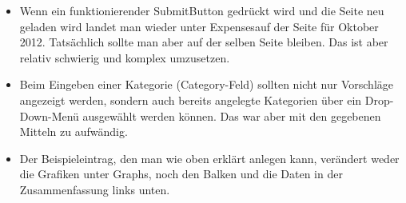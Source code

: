\documentclass[a4paper,10pt]{article}
\begin{document}
\begin{itemize}
    \item Wenn ein funktionierender \glqq Submit\grqq\space Button gedr\"uckt wird
            und die Seite neu geladen wird landet man wieder unter \glqq
            Expenses\grqq\space auf der Seite f\"ur Oktober 2012. Tats\"achlich
            sollte man aber auf der selben Seite bleiben. Das ist aber relativ
            schwierig und komplex umzusetzen.
    \item Beim Eingeben einer Kategorie (\glqq Category\grqq-Feld) sollten nicht nur
            Vorschl\"age angezeigt werden, sondern auch bereits angelegte Kategorien
            \"uber ein Drop-Down-Men\"u ausgew\"ahlt werden k\"onnen. Das war aber
            mit den gegebenen Mitteln zu aufw\"andig.
    \item Der Beispieleintrag, den man wie oben erkl\"art anlegen kann, ver\"andert
            weder die Grafiken unter \glqq Graphs\grqq, noch den Balken und die Daten
            in der Zusammenfassung links unten.
\end{itemize}
\end{document}
